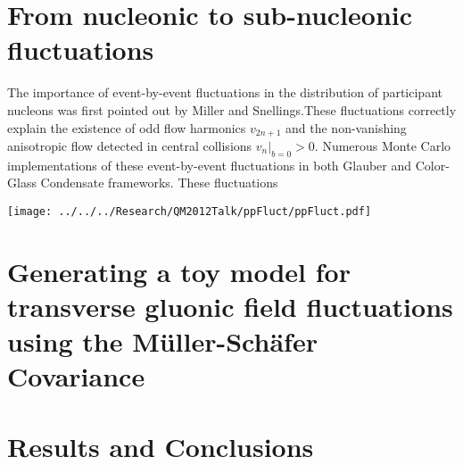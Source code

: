 \documentclass[a4paper,10pt]{elsarticle}
\begin{document}
\section{From nucleonic to sub-nucleonic fluctuations}

The importance of event-by-event fluctuations in the distribution of participant nucleons was first pointed out by Miller and Snellings.These fluctuations correctly explain
the existence of odd flow harmonics $v_{2n+1}$ and the non-vanishing anisotropic flow detected in central collisions $v_n | _{b=0} >0$. Numerous Monte Carlo implementations 
of these event-by-event fluctuations in both Glauber and Color-Glass Condensate frameworks. These fluctuations



\begin{center}
 \texttt{[image: ../../../Research/QM2012Talk/ppFluct/ppFluct.pdf]}
\end{center}

\section{Generating a toy model for transverse gluonic field fluctuations using the M\"uller-Sch\"afer Covariance}



\section{Results and Conclusions}
\end{document}
